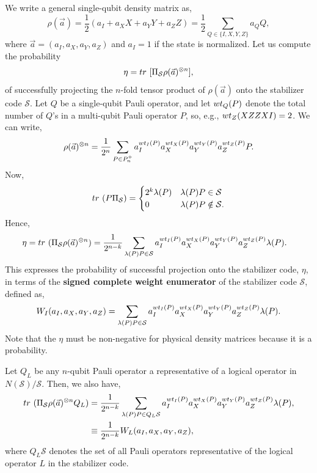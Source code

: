 \documentclass[11pt]{article}
\newcommand{\wt}{{\rm{wt}} }
\newcommand{\tr}{{\rm{tr~}}}
\begin{document}
We write a general single-qubit density matrix as,
\begin{equation}
\rho(\vec{a}) = \frac{1}{2}\left( a_I + a_X X+a_Y Y +a_Z Z\right) = \frac{1}{2}\sum_{Q \in \{I,X,Y,Z\}} a_Q Q,
\end{equation}
where $\vec{a}=(a_I, a_X, a_Y, a_Z)$ and $a_I=1$ if the state is normalized. 
Let us compute the probability 
\begin{equation}
    \eta = \tr [\Pi_{\mathcal S} \rho(\vec{a})^{\otimes n}],
\end{equation} 
of successfully projecting the $n$-fold tensor product of $\rho(\vec{a})$ onto the stabilizer code $\mathcal S$. Let $Q$ be a single-qubit Pauli operator, and let $\wt_Q(P)$ denote the total number of $Q$'s in a multi-qubit Pauli operator $P$, so, e.g., $\wt_Z(XZZXI)=2$. We can write,
\begin{equation}
\rho(\vec{a})^{\otimes n} = \frac{1}{2^n}\sum_{P \in {P_n^+}} a_I^{\wt_I(P)}a_X^{\wt_X(P)}a_Y^{\wt_Y(P)}a_Z^{\wt_Z(P)} P.
\end{equation}
Now,
\begin{equation}
 \tr (P\Pi_{\mathcal S} ) = \begin{cases} 2^k \lambda(P) & \lambda(P) P \in \mathcal S \\ 0 & \lambda(P) P \notin \mathcal S. \end{cases}
\end{equation} Hence,
\begin{equation}
\begin{split}
    \eta = \tr (\Pi_{\mathcal S}\rho(\vec{a})^{\otimes n})  
    & = \frac{1}{2^{n-k}}\sum_{\lambda(P) P \in {\mathcal S}} a_I^{\wt_I(P)}a_X^{\wt_X(P)}a_Y^{\wt_Y(P)}a_Z^{\wt_Z(P)} \lambda(P). \label{stabilizer-projection-signed-cwe}
\end{split}
\end{equation}
This expresses the probability of successful projection onto the stabilizer code, $\eta$, in terms of the \textbf{signed complete weight enumerator} of the stabilizer code $\mathcal S$, defined as,
\begin{equation}
    W_I(a_I,a_X, a_Y, a_Z) = \sum_{\lambda(P) P \in {\mathcal S}} a_I^{\wt_I(P)}a_X^{\wt_X(P)}a_Y^{\wt_Y(P)}a_Z^{\wt_Z(P)} \lambda(P). 
\end{equation}
Note that the $\eta$ must be non-negative for physical density matrices because it is a probability. 

Let $Q_L$ be any $n$-qubit Pauli operator a representative of a logical operator in $N(\mathcal S)/\mathcal S$. Then, we also have,
\begin{equation}
\begin{split}
   \tr (\Pi_{\mathcal{S}} \rho(\vec{a})^{\otimes n}Q_L ) & =  \frac{1}{2^{n-k}} \sum_{\lambda(P) P \in Q_L {\mathcal S}} a_I^{\wt_I(P)}a_X^{\wt_X(P)}a_Y^{\wt_Y(P)}a_Z^{\wt_Z(P)} \lambda(P), \\
   & \equiv 
    \frac{1}{2^{n-k}} W_L(a_I,a_X, a_Y, a_Z), 
\end{split}
\end{equation}
where $Q_L \mathcal S$ denotes the set of all Pauli operators representative of the logical operator $L$ in the stabilizer code. 
\end{document}
